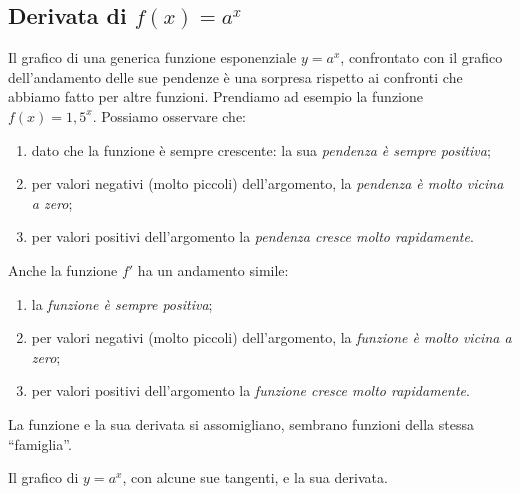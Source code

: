 \subsection{Derivata di \(f(x)=a^x\)}
\label{subsubsec:deri_a_alla_x}

Il grafico di una generica funzione esponenziale \(y=a^x\), confrontato con 
il grafico dell'andamento delle sue pendenze è una sorpresa rispetto ai 
confronti che abbiamo fatto per altre funzioni. 
Prendiamo ad esempio la funzione \(f(x) = 1,5^x\).
Possiamo osservare che:
\begin{enumerate} [nosep]
\item dato che la funzione è sempre crescente: 
la sua \emph{pendenza è sempre positiva};
\item per valori negativi (molto piccoli) dell'argomento, 
la \emph{pendenza è molto vicina a zero};
\item per valori positivi dell'argomento la \emph{pendenza cresce molto 
rapidamente}.
\end{enumerate}
Anche la funzione \(f'\) ha un andamento simile:
\begin{enumerate} [nosep]
\item la \emph{funzione è sempre positiva};
\item per valori negativi (molto piccoli) dell'argomento, 
la \emph{funzione è molto vicina a zero};
\item per valori positivi dell'argomento la \emph{funzione cresce molto 
rapidamente}.
\end{enumerate}

La funzione e la sua derivata si assomigliano, sembrano funzioni della stessa 
``famiglia''.

\begin{inaccessibleblock}
\hspace{-10mm}
\end{inaccessibleblock}
\label{}
\begin{center} Il grafico di \(y=a^x\), con alcune sue tangenti, e 
la sua derivata.\end{center}

